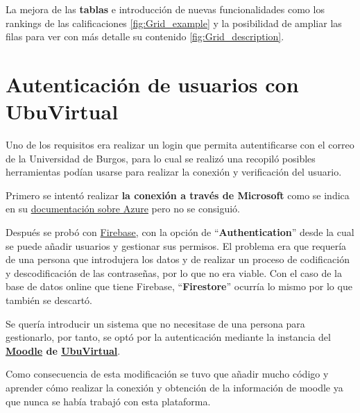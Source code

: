 
La mejora de las \textbf{tablas} e introducción de nuevas funcionalidades como los rankings de las calificaciones \ref{fig:Grid_example} y la posibilidad de ampliar las filas para ver con más detalle su contenido \ref{fig:Grid_description}.



\section{Autenticación de usuarios con UbuVirtual}

Uno de los requisitos era realizar un login que permita autentificarse con el correo de la Universidad de Burgos, para lo cual se realizó una recopiló posibles herramientas podían usarse para realizar la conexión y verificación del usuario.

Primero se intentó realizar \textbf{la conexión a través de Microsoft} como se indica en su \href{https://docs.microsoft.com/en-us/azure/active-directory/develop/quickstart-v2-java-webapp}{documentación sobre Azure} pero no se consiguió.

Después se probó con \href{https://firebase.google.com/}{Firebase}, con la opción de ``\textbf{Authentication}'' desde la cual se puede añadir usuarios y gestionar sus permisos. El problema era que requería de una persona que introdujera los datos y de realizar un proceso de codificación y descodificación de las contraseñas, por lo que no era viable. Con el caso de la base de datos online que tiene Firebase, ``\textbf{Firestore}'' ocurría lo mismo por lo que también se descartó.  

Se quería introducir un sistema que no necesitase de una persona para gestionarlo, por tanto, se optó por la autenticación mediante la instancia del \textbf{\href{https://moodle.org/}{Moodle} de \href{https://ubuvirtual.ubu.es/}{UbuVirtual}}. 

Como consecuencia de esta modificación se tuvo que añadir mucho código y aprender cómo realizar la conexión y obtención de la información de moodle ya que nunca se había trabajó con esta plataforma.
